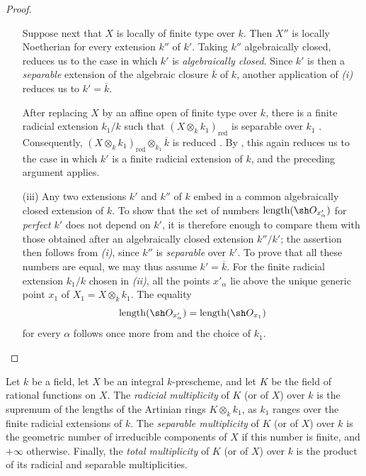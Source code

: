 \begin{proof}
\begin{enumerate}
Suppose next that $X$ is locally of finite type over $k$.
Then $X''$ is locally Noetherian for every extension $k''$ of $k'$.
Taking $k''$ algebraically closed,  reduces us to
the case in which $k'$ is \emph{algebraically closed}.
Since $k'$ is then a \emph{separable} extension of the algebraic closure
$\overline k$ of $k$, another application of \emph{(i)} reduces us to
$k'=\overline k$.


After replacing $X$ by an affine open of finite type over $k$, there
is a finite radicial extension $k_1/k$ such that
$(X\otimes_k k_1)_{\mathrm{red}}$ is separable over $k_1$
.
Consequently,
$(X\otimes_k k_1)_{\mathrm{red}}\otimes_{k_1}\overline k$ is reduced
.
By , this again reduces us to the case in which
$k'$ is a finite radicial extension of $k$, and the preceding
argument applies.

\item[\rm(iii)]
Any two extensions $k'$ and $k''$ of $k$ embed in a common
algebraically closed extension of $k$.
To show that the set of numbers
$\operatorname{length}(\sh O_{x'_\alpha})$ for \emph{perfect} $k'$ does
not depend on $k'$, it is therefore enough to compare them with those
obtained after an algebraically closed extension $k''/k'$; the
assertion then follows from \emph{(i)}, since $k''$ is \emph{separable}
over $k'$.
To prove that all these numbers are equal, we may thus assume
$k'=\overline k$.
For the finite radicial extension $k_1/k$ chosen in \emph{(ii)}, all
the points $x'_\alpha$ lie above the unique generic point $x_1$ of
$X_1=X\otimes_k k_1$.
The equality
\[
\operatorname{length}(\sh O_{x'_\alpha})
=\operatorname{length}(\sh O_{x_1})
\]
for every $\alpha$ follows once more from  and the
choice of $k_1$.
\end{enumerate}
\end{proof}

\begin{definition}[4.7.4]
\label{IV.4.7.4}
Let $k$ be a field, let $X$ be an integral $k$-prescheme, and let $K$
be the field of rational functions on $X$.
The \emph{radicial multiplicity} of $K$ (or of $X$) over $k$ is the
supremum of the lengths of the Artinian rings $K\otimes_k k_1$, as
$k_1$ ranges over the finite radicial extensions of $k$.
The \emph{separable multiplicity} of $K$ (or of $X$) over $k$ is the
geometric number of irreducible components of $X$ if this number is
finite, and $+\infty$ otherwise.
Finally, the \emph{total multiplicity} of $K$ (or of $X$) over $k$ is
the product of its radicial and separable multiplicities.
\end{definition}

